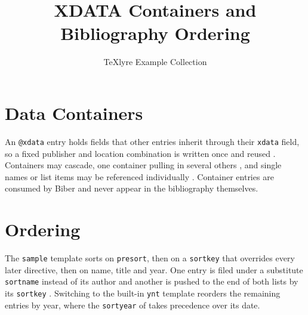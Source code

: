 \documentclass{article}
\title{XDATA Containers and Bibliography Ordering}
\author{TeXlyre Example Collection}
\begin{document}
\maketitle

\section{Data Containers}

An \texttt{@xdata} entry holds fields that other entries inherit through their
\texttt{xdata} field, so a fixed publisher and location combination is written once
and reused \parencite{xdata:single}. Containers may cascade, one container pulling
in several others \parencite{xdata:cascade}, and single names or list items may be
referenced individually \parencite{xdata:granular}. Container entries are consumed
by Biber and never appear in the bibliography themselves.

\section{Ordering}

The \texttt{sample} template sorts on \texttt{presort}, then on a \texttt{sortkey}
that overrides every later directive, then on name, title and year. One entry is
filed under a substitute \texttt{sortname} instead of its author
\parencite{sorting:sortname} and another is pushed to the end of both lists by its
\texttt{sortkey} \parencite{sorting:sortkey}. Switching to the built-in
\texttt{ynt} template reorders the remaining entries by year, where the
\texttt{sortyear} of \textcite{xdata:cascade} takes precedence over its date.

\printbibliography[title={Sorted by the \texttt{sample} template}]

\newrefcontext[sorting=ynt]
\printbibliography[title={Sorted by the built-in \texttt{ynt} template}]
\end{document}
